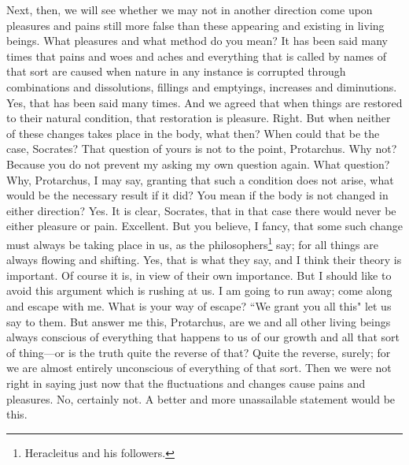 \documentclass[letterpaper,12pt]{article}
\newcommand{\stephpag}[1]{\marginnote{\small\itshape\fontfamily{ppl}\selectfont #1}}
\begin{document}
\begin{drama}
\socratesspeaks
Next, then, we will see whether we may not in another direction come upon pleasures and pains still more false than these appearing and existing in living beings.
\protarchusspeaks
What pleasures and what method do you mean?
\socratesspeaks
It has been said many times that pains and woes and aches and everything that is called by names of that sort are caused when nature in any instance is corrupted through combinations and dissolutions, \stephpag{d} fillings and emptyings, increases and diminutions.
\protarchusspeaks
Yes, that has been said many times.
\socratesspeaks
And we agreed that when things are restored to their natural condition, that restoration is pleasure.
\protarchusspeaks
Right.
\socratesspeaks
But when neither of these changes takes place in the body, what then?
\protarchusspeaks
When could that be the case, Socrates? \stephpag{e}
\socratesspeaks
That question of yours is not to the point, Protarchus.
\protarchusspeaks
Why not?
\socratesspeaks
Because you do not prevent my asking my own question again.
\protarchusspeaks
What question?
\socratesspeaks
Why, Protarchus, I may say, granting that such a condition does not arise, what would be the necessary result if it did?
\protarchusspeaks
You mean if the body is not changed in either direction?
\socratesspeaks
Yes.
\protarchusspeaks
It is clear, Socrates, that in that case there would never be either pleasure or pain. \stephpag{43 a}
\socratesspeaks
Excellent. But you believe, I fancy, that some such change must always be taking place in us, as the philosophers\footnote{Heracleitus and his followers.} say; for all things are always flowing and shifting.
\protarchusspeaks
Yes, that is what they say, and I think their theory is important.
\socratesspeaks
Of course it is, in view of their own importance. But I should like to avoid this argument which is rushing at us. I am going to run away; come along and escape with me.
\protarchusspeaks
What is your way of escape?
\socratesspeaks
``We grant you all this" let us say to them. \stephpag{b} But answer me this, Protarchus, are we and all other living beings always conscious of everything that happens to us of our growth and all that sort of thing---or is the truth quite the reverse of that?
\protarchusspeaks
Quite the reverse, surely; for we are almost entirely unconscious of everything of that sort.
\socratesspeaks
Then we were not right in saying just now that the fluctuations and changes cause pains and pleasures.
\protarchusspeaks
No, certainly not. \stephpag{c}
\socratesspeaks
A better and more unassailable statement would be this.

\end{drama}
\end{document}

